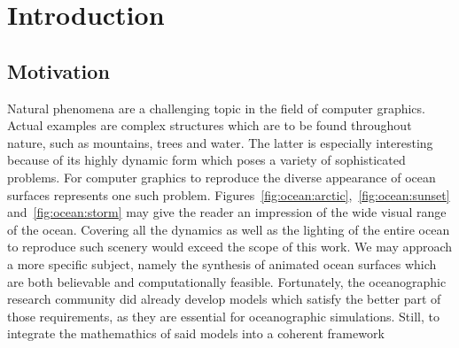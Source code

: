 \chapter{Introduction}
\label{ch:intro}
%
\section{Motivation}
\label{sec:motivation}
Natural phenomena are a challenging topic in the field of computer graphics.
Actual examples are complex structures which are to be found throughout nature,
such as mountains, trees and water. The latter is especially interesting
because of its highly dynamic form which poses a variety of sophisticated problems.
For computer graphics to reproduce the diverse appearance of ocean surfaces
represents one such problem.
Figures~\ref{fig:ocean:arctic},~\ref{fig:ocean:sunset} and~\ref{fig:ocean:storm}
may give the reader an impression of the wide visual range of the ocean.
Covering all the dynamics as well as the lighting of the entire ocean to
reproduce such scenery would exceed the scope of this work.
We may approach a more specific subject, namely the synthesis of animated ocean
surfaces which are both believable and computationally feasible.
Fortunately, the oceanographic research community did already develop models
which satisfy the better part of those requirements, as they are essential for
oceanographic simulations.
Still, to integrate the mathemathics of said models into a coherent framework
